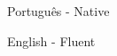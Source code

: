 
\begin{cventries}
  \cventry
  {}
  {
    \begin{cvitems} %
      \item {Português - Native}
      \item {English - Fluent}
    \end{cvitems}
  }
  {} {} {}

\end{cventries}